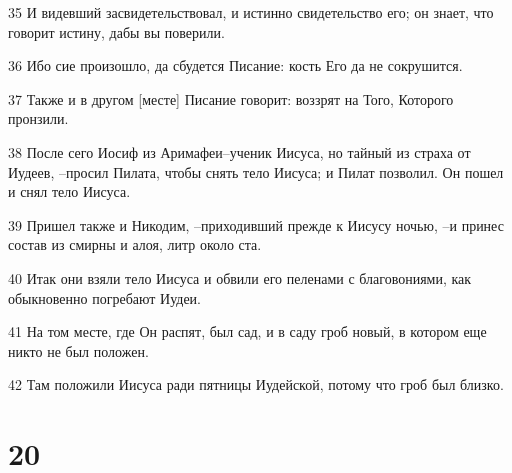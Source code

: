 \par 35 И видевший засвидетельствовал, и истинно свидетельство его; он знает, что говорит истину, дабы вы поверили.
\par 36 Ибо сие произошло, да сбудется Писание: кость Его да не сокрушится.
\par 37 Также и в другом [месте] Писание говорит: воззрят на Того, Которого пронзили.
\par 38 После сего Иосиф из Аримафеи--ученик Иисуса, но тайный из страха от Иудеев, --просил Пилата, чтобы снять тело Иисуса; и Пилат позволил. Он пошел и снял тело Иисуса.
\par 39 Пришел также и Никодим, --приходивший прежде к Иисусу ночью, --и принес состав из смирны и алоя, литр около ста.
\par 40 Итак они взяли тело Иисуса и обвили его пеленами с благовониями, как обыкновенно погребают Иудеи.
\par 41 На том месте, где Он распят, был сад, и в саду гроб новый, в котором еще никто не был положен.
\par 42 Там положили Иисуса ради пятницы Иудейской, потому что гроб был близко.

\chapter{20}

